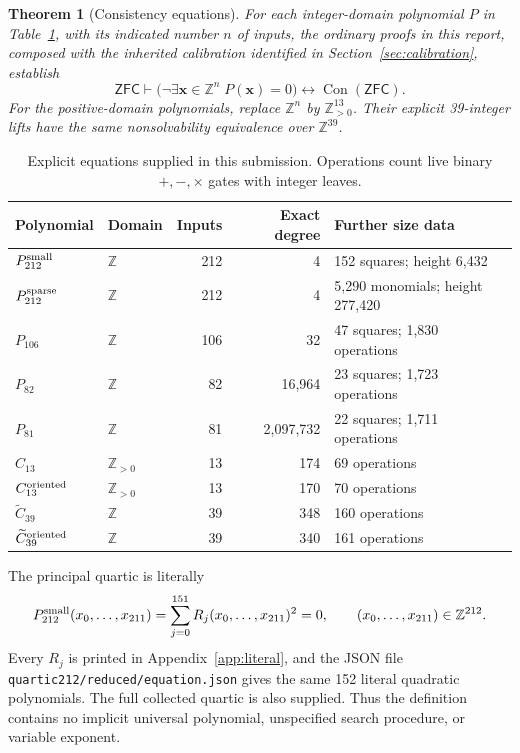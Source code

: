 \documentclass[10pt,letterpaper]{article}
\newtheorem{theorem}{Theorem}[section]
\theoremstyle{remark}\newtheorem{remark}[theorem]{Remark}
\newcommand{\Z}{\mathbb Z}\newcommand{\N}{\mathbb N}
\newcommand{\Con}{\operatorname{Con}}
\newcommand{\ZFC}{\mathsf{ZFC}}
\newcommand{\pathtext}[1]{\nolinkurl{#1}}
\begin{document}
\begin{theorem}[Consistency equations]
For each integer-domain polynomial $P$ in Table~\ref{tab:new}, with its
indicated number $n$ of inputs, the ordinary proofs in this report,
composed with the inherited calibration identified in
Section~\ref{sec:calibration}, establish
\[
 \ZFC\vdash
 \bigl(\neg\exists\boldsymbol x\in\Z^n\;P(\boldsymbol x)=0\bigr)
 \longleftrightarrow\Con(\ZFC).
\]
For the positive-domain polynomials, replace $\Z^n$ by
$\Z_{>0}^{13}$. Their explicit 39-integer lifts have the same
nonsolvability equivalence over $\Z^{39}$.
\end{theorem}

\begin{table}[ht]
\centering\small
\begin{tabular}{@{}llrrl@{}}
\toprule
Polynomial & Domain & Inputs & Exact degree & Further size data\\
\midrule
$P_{212}^{\rm small}$ & $\Z$ &212&4&152 squares; height 6,432\\
$P_{212}^{\rm sparse}$ & $\Z$ &212&4&5,290 monomials; height 277,420\\
$P_{106}$ & $\Z$ &106&32&47 squares; 1,830 operations\\
$P_{82}$ & $\Z$ &82&16,964&23 squares; 1,723 operations\\
$P_{81}$ & $\Z$ &81&2,097,732&22 squares; 1,711 operations\\
$C_{13}$ & $\Z_{>0}$ &13&174&69 operations\\
$C_{13}^{\rm oriented}$ & $\Z_{>0}$ &13&170&70 operations\\
$\widetilde C_{39}$ & $\Z$ &39&348&160 operations\\
$\widetilde C_{39}^{\rm oriented}$ & $\Z$ &39&340&161 operations\\
\bottomrule
\end{tabular}
\caption{Explicit equations supplied in this submission. Operations count
live binary $+,-,\times$ gates with integer leaves.}
\label{tab:new}
\end{table}

The principal quartic is literally
\begin{equation}\label{eq:mainquartic}
 P_{212}^{\rm small}(x_0,\ldots,x_{211})
 =\sum_{j=0}^{151}R_j(x_0,\ldots,x_{211})^2=0,
 \qquad (x_0,\ldots,x_{211})\in\Z^{212}.
\end{equation}
Every $R_j$ is printed in Appendix~\ref{app:literal}, and the JSON file
\pathtext{quartic212/reduced/equation.json} gives the same 152 literal
quadratic polynomials. The full collected quartic is also supplied. Thus
the definition contains no implicit universal polynomial, unspecified
search procedure, or variable exponent.
\end{document}
